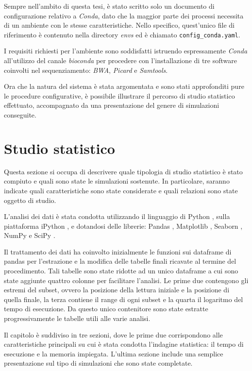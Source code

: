 Sempre nell'ambito di questa tesi, è stato scritto solo un documento di configurazione relativo a \textit{Conda}, dato che la maggior parte dei processi necessita di un ambiente con le stesse caratteristiche.
Nello specifico, quest'unico file di riferimento è contenuto nella directory \textit{envs} ed è chiamato \verb!config_conda.yaml!.

I requisiti richiesti per l'ambiente sono soddisfatti istruendo espressamente \textit{Conda} all'utilizzo del canale \textit{bioconda} per procedere con l'installazione di tre software coinvolti nel sequenziamento: \textit{BWA}, \textit{Picard} e \textit{Samtools}.

Ora che la natura del sistema è stata argomentata e sono stati approfonditi pure le procedure configurative, è possibile illustrare il percorso di studio statistico effettuato, accompagnato da una presentazione del genere di simulazioni conseguite.

\section{Studio statistico}
Questa sezione si occupa di descrivere quale tipologia di studio statistico è stato compiuto e quali sono state le simulazioni sostenute. 
In particolare, saranno indicate quali caratteristiche sono state considerate e quali relazioni sono state oggetto di studio.     

L'analisi dei dati è stata condotta utilizzando il linguaggio di Python \cite{Python}, sulla piattaforma iPython \cite{IPython}, e dotandosi delle librerie: Pandas \cite{pandas}, Matplotlib \cite{Matplotlib}, Seaborn \cite{seaborn}, NumPy \cite{Numpy} e SciPy \cite{Scipy}.

Il trattamento dei dati ha coinvolto inizialmente le funzioni sui dataframe di pandas per l'estrazione e la modifica delle tabelle finali ricavate al termine del procedimento.
Tali tabelle sono state ridotte ad un unico dataframe a cui sono state aggiunte quattro colonne per facilitare l'analisi. 
Le prime due contengono gli estremi del subset, ovvero la posizione della lettura iniziale e la posizione di quella finale, la terza contiene il range di ogni subset e la quarta il logaritmo del tempo di esecuzione.
Da questo unico contenitore sono state estratte progressivamente le tabelle utili alle varie analisi.

Il capitolo è suddiviso in tre sezioni, dove le prime due corrispondono alle caratteristiche principali su cui è stata condotta l'indagine statistica: il tempo di esecuzione e la memoria impiegata. 
L'ultima sezione include una semplice presentazione sul tipo di simulazioni che sono state completate.


